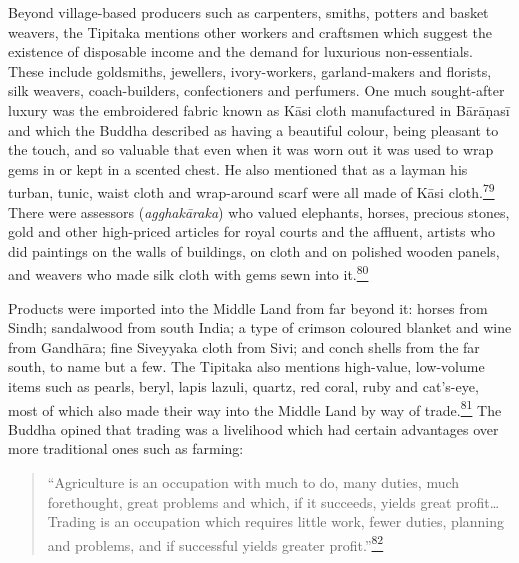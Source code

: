 Beyond village-based producers such as carpenters, smiths, potters and
basket weavers, the Tipitaka mentions other workers and craftsmen which
suggest the existence of disposable income and the demand for luxurious
non-essentials. These include goldsmiths, jewellers, ivory-workers,
garland-makers and florists, silk weavers, coach-builders, confectioners
and perfumers. One much sought-after luxury was the embroidered fabric
known as Kāsi cloth manufactured in Bārāṇasī and which the Buddha
described as having a beautiful colour, being pleasant to the touch, and
so valuable that even when it was worn out it was used to wrap gems in
or kept in a scented chest. He also mentioned that as a layman his
turban, tunic, waist cloth and wrap-around scarf were all made of Kāsi
cloth.\label{footprints_split_006.html_fnref79}\hyperref[footprints_split_024.htmlux5cux23fn79]{\textsuperscript{79}}
There were assessors (\emph{agghakāraka}) who valued elephants, horses,
precious stones, gold and other high-priced articles for royal courts
and the affluent, artists who did paintings on the walls of buildings,
on cloth and on polished wooden panels, and weavers who made silk cloth
with gems sewn into
it.\label{footprints_split_006.html_fnref80}\hyperref[footprints_split_024.htmlux5cux23fn80]{\textsuperscript{80}}

Products were imported into the Middle Land from far beyond it: horses
from Sindh; sandalwood from south India; a type of crimson coloured
blanket and wine from Gandhāra; fine Siveyyaka cloth from Sivi; and
conch shells from the far south, to name but a few. The Tipitaka also
mentions high-value, low-volume items such as pearls, beryl, lapis
lazuli, quartz, red coral, ruby and cat's-eye, most of which also made
their way into the Middle Land by way of
trade.\label{footprints_split_006.html_fnref81}\hyperref[footprints_split_024.htmlux5cux23fn81]{\textsuperscript{81}}
The Buddha opined that trading was a livelihood which had certain
advantages over more traditional ones such as farming:

\begin{quote}
``Agriculture is an occupation with much to do, many duties, much
forethought, great problems and which, if it succeeds, yields great
profit\ldots{} Trading is an occupation which requires little work,
fewer duties, planning and problems, and if successful yields greater
profit.''\label{footprints_split_006.html_fnref82}\hyperref[footprints_split_024.htmlux5cux23fn82]{\textsuperscript{82}}
\end{quote}

